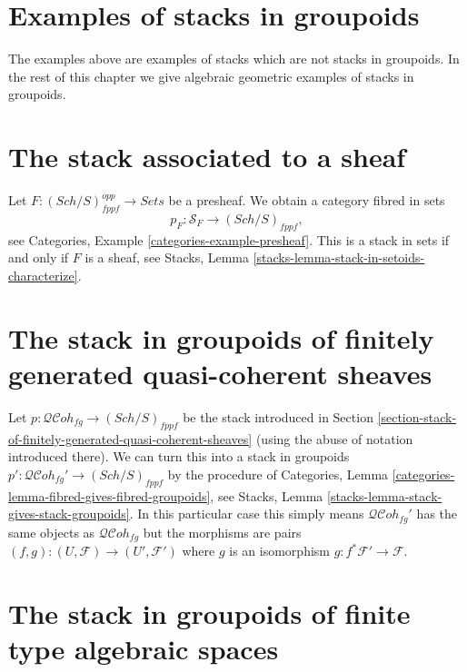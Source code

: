 \documentclass{stacks-project}
\theoremstyle{plain}
\theoremstyle{definition}
\theoremstyle{remark}
\numberwithin{equation}{subsection}
\def\Sch{\mathit{Sch}}
\def\QCohstack{\mathcal{QC}\!\mathit{oh}}
\begin{document}
\section{Examples of stacks in groupoids}
\label{section-examples-stacks-in-groupoids}

\noindent
The examples above are examples of stacks which are not stacks in
groupoids. In the rest of this chapter we give
algebraic geometric examples of stacks in groupoids.



\section{The stack associated to a sheaf}
\label{section-stack-associated-to-sheaf}

\noindent
Let $F : (\Sch/S)_{fppf}^{opp} \to \textit{Sets}$ be a presheaf.
We obtain a category fibred in sets
$$
p_F : \mathcal{S}_F \to (\Sch/S)_{fppf},
$$
see
Categories, Example \ref{categories-example-presheaf}.
This is a stack in sets if and only if $F$ is a sheaf, see
Stacks, Lemma \ref{stacks-lemma-stack-in-setoids-characterize}.



\section{The stack in groupoids of finitely generated quasi-coherent sheaves}
\label{section-stack-in-groupoids-of-quasi-coherent-sheaves}

\noindent
Let $p : \QCohstack_{fg} \to (\Sch/S)_{fppf}$ be the stack
introduced in
Section \ref{section-stack-of-finitely-generated-quasi-coherent-sheaves}
(using the abuse of notation introduced there).
We can turn this into a stack in groupoids
$p' : \QCohstack_{fg}' \to (\Sch/S)_{fppf}$ by
the procedure of
Categories, Lemma \ref{categories-lemma-fibred-gives-fibred-groupoids},
see
Stacks, Lemma \ref{stacks-lemma-stack-gives-stack-groupoids}.
In this particular case this simply means $\QCohstack_{fg}'$ has
the same objects as $\QCohstack_{fg}$ but the morphisms are
pairs $(f, g) : (U, \mathcal{F}) \to (U', \mathcal{F}')$
where $g$ is an isomorphism $g : f^*\mathcal{F}' \to \mathcal{F}$.


\section{The stack in groupoids of finite type algebraic spaces}
\label{section-stack-in-groupoids-of-finite-type-spaces}
\end{document}
